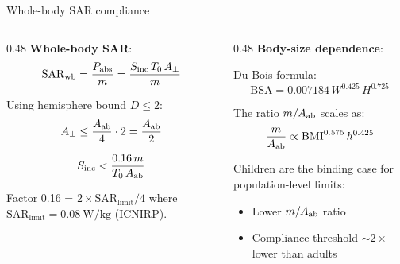 \begin{frame}[label=app-p1-compliance]{Whole-body SAR compliance}

  \begin{columns}[T]
    \begin{column}{0.48\textwidth}
      \textbf{Whole-body SAR}:
      \[
        \mathrm{SAR}_{\mathrm{wb}} = \frac{P_{\mathrm{abs}}}{m} = \frac{S_{\mathrm{inc}}\, T_0\, A_{\perp}}{m}
      \]

      Using hemisphere bound $D \le 2$:
      \[
        A_{\perp} \le \frac{A_{\mathrm{ab}}}{4} \cdot 2 = \frac{A_{\mathrm{ab}}}{2}
      \]

      \begin{resultbox}
        \vspace{-6pt}
        \[
          S_{\mathrm{inc}} < \frac{0.16\, m}{T_0\, A_{\mathrm{ab}}}
        \]
      \end{resultbox}

      {\footnotesize Factor 0.16 = $2 \times \mathrm{SAR}_{\mathrm{limit}} / 4$ where $\mathrm{SAR}_{\mathrm{limit}} = \SI{0.08}{\watt\per\kilo\gram}$ (ICNIRP).}
    \end{column}

    \begin{column}{0.48\textwidth}
      \textbf{Body-size dependence}:

      Du Bois formula:
      \[
        \mathrm{BSA} = 0.007184\, W^{0.425}\, H^{0.725}
      \]

      The ratio $m/A_{\mathrm{ab}}$ scales as:
      \[
        \frac{m}{A_{\mathrm{ab}}} \propto \mathrm{BMI}^{0.575}\, h^{0.425}
      \]

      \vspace{4pt}
      Children are the binding case for population-level limits:
      \begin{itemize}
        \item Lower $m/A_{\mathrm{ab}}$ ratio
        \item Compliance threshold ${\sim}2\times$ lower than adults
      \end{itemize}
    \end{column}
  \end{columns}

  \vspace{2pt}
\end{frame}

